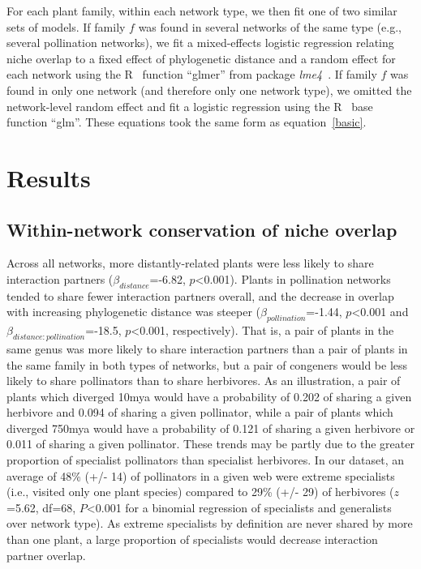 \documentclass[12pt]{article}
\begin{document}
\begin{spacing}{1.5}
  For each plant family, within each network type, we then fit one of two 
  similar sets of models. If family $f$ was found in several networks of 
  the same type (e.g., several pollination networks), we fit a 
  mixed-effects logistic regression relating niche overlap to a fixed 
  effect of phylogenetic distance and a random effect for each network 
  using the R~\citep{R} function ``glmer'' from package
   \emph{lme4}~\citep{lme4}. If family $f$ was found in only one network
  (and therefore only one network type), we omitted the 
  network-level random effect and fit a logistic regression using the 
  R~\citep{R} base function ``glm''. These equations took the same form as equation~\ref{basic}.


\section*{Results}


  \subsection*{Within-network conservation of niche overlap} 

    Across all networks, more distantly-related plants were less likely to 
    share interaction partners ($\beta_{distance}$=-6.82, 
    $p$\textless0.001). Plants in pollination networks tended to share 
    fewer interaction partners overall, and the decrease in overlap with 
    increasing phylogenetic distance was steeper 
    ($\beta_{pollination}$=-1.44, $p$\textless0.001 and 
    $\beta_{distance:pollination}$=-18.5, $p$\textless0.001, respectively). 
    That is, a pair of plants in the same genus was more likely to share 
    interaction partners than a pair of plants in the same family in both 
    types of networks, but a pair of congeners would be less likely to 
    share pollinators than to share herbivores. As an illustration, a pair
    of plants which diverged 10mya would have a probability of 0.202 of sharing
    a given herbivore and 0.094 of sharing a given pollinator, while a 
    pair of plants which diverged 750mya would 
    have a probability of 0.121 of sharing a given herbivore or 
    0.011 of sharing a given pollinator.
    These trends may be partly 
    due to the greater proportion of specialist pollinators than specialist 
    herbivores. In our dataset, an average of 48\% (+/- 14) of pollinators 
    in a given web were extreme specialists (i.e., visited only one plant 
    species) compared to 29\% (+/- 29) of herbivores ($z$=5.62, df=68, 
    $P$\textless0.001 for a binomial regression of specialists and 
    generalists over network type). As extreme specialists by definition 
    are never shared by more than one plant, a large proportion of specialists
    would decrease interaction partner overlap.



\end{spacing}
\end{document}
